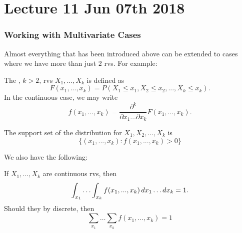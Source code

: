 \documentclass[notoc,notitlepage]{tufte-book}
\begin{document}

\chapter{Lecture 11 Jun 07th 2018}%
\label{chp:lecture_11_jun_07th_2018}

\subsection{Working with Multivariate Cases}%
\label{sub:working_with_multivariate_cases}

Almost everything that has been introduced above can be extended to cases where we have more than just $2$ rvs. For example:

\begin{defn}
\label{defn:k_variate_cdf}
  The , $k > 2$, rvs $X_1, ..., X_k$ is defined as
  \begin{equation*}
    F(x_1, ..., x_k) = P(X_1 \leq x_1, X_2 \leq x_2, ..., X_k \leq x_k).
  \end{equation*}
  In the continuous case, we may write
  \begin{equation*}
    f(x_1, ..., x_k) = \frac{\partial^k}{\partial x_1 \hdots \partial x_k} F(x_1, ..., x_k).
  \end{equation*}
\end{defn}

\begin{defn}
\label{defn:k_variate_support_set}
  The support set of the distribution for $X_1, X_2, ..., X_k$ is
  \begin{equation*}
    \{(x_1, ..., x_k) : f(x_1, ..., x_k) > 0 \}
  \end{equation*}
\end{defn}

We also have the following:

\begin{propo}
\label{propo:law_of_total_probability_multivariate}
  If $X_1, ..., X_k$ are continuous rvs, then
  \begin{equation*}
    \int_{x_1} \hdots \int_{x_k} f(x_1, ..., x_k) \mathop{}\!d{x_1} \hdots \mathop{}\!d{x_k} = 1.
  \end{equation*}
  Should they by discrete, then
  \begin{equation*}
    \sum_{x_1} \hdots \sum_{x_k} f(x_1, ..., x_k) = 1
  \end{equation*}
\end{propo}
\end{document}
